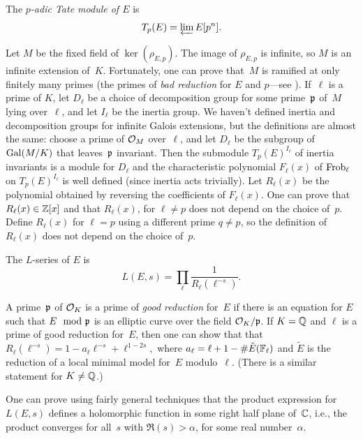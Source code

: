 \begin{definition}
The \emph{$p$-adic Tate module of $E$} is
$$
  T_p(E) = \varprojlim E[p^n].
$$
\end{definition}

Let $M$ be the fixed field of $\ker(\rho_{E,p})$. The image of
$\rho_{E,p}$ is infinite, so $M$ is an infinite extension of~$K$.
Fortunately, one can prove that~$M$ is ramified at only finitely many
primes (the primes of \emph{bad reduction} for $E$ and $p$---see
\cite{serre-tate}).
If~$\ell$ is a prime of $K$, let $D_{\ell}$ be a choice of
decomposition group for
some prime~$\mathfrak{p}$ of~$M$ lying over~$\ell$, and let $I_{\ell}$ be the
inertia group.  We haven't defined inertia and decomposition groups
for infinite Galois extensions, but the definitions are almost the
same: choose a prime of $\mathcal{O}_M$ over~$\ell$, and let $D_{\ell}$ be the
subgroup of $\operatorname{Gal}(M/K)$ that leaves~$\mathfrak{p}$ invariant.  Then the
submodule $T_p(E)^{I_{\ell}}$ of inertia invariants is a module for
$D_{\ell}$ and the characteristic polynomial $F_{\ell}(x)$ of
$\operatorname{Frob}_{\ell}$ on $T_p(E)^{I_{\ell}}$ is well defined (since inertia
acts trivially).  Let $R_{\ell}(x)$ be the polynomial obtained by
reversing the coefficients of $F_{\ell}(x)$.  One can prove that
$R_{\ell}(x) \in \mathbb{Z}[x]$ and that $R_{\ell}(x)$, for $\ell\neq p$ does
not depend on the choice of~$p$.  Define $R_{\ell}(x)$ for $\ell=p$
using a different prime $q\neq p$, so the definition of $R_{\ell}(x)$
does not depend on the choice of~$p$.
\begin{definition}
The $L$-series of $E$ is
$$
 L(E,s) = \prod_{\ell} \frac{1}{R_\ell(\ell^{-s})}.
$$
\end{definition}

A prime~$\mathfrak{p}$ of $\mathcal{O}_K$ is a prime of \emph{good reduction} for~$E$ if
there is an equation for $E$ such that $E \mod {\mathfrak{p}}$ is an elliptic
curve over the field $\mathcal{O}_K/\mathfrak{p}$. If $K=\mathbb{Q}$ and $\ell$ is a prime of
good reduction for~$E$, then one can show that that
$R_{\ell}(\ell^{-s}) = 1 - a_\ell \ell^{-s} + \ell^{1-2s},$
where
$
  a_{\ell} = \ell + 1 - \#\tilde{E}(\mathbb{F}_\ell)
$
and $\tilde{E}$ is the reduction of a local minimal
model for~$E$ modulo~$\ell$.  (There is a similar statement
for $K\neq \mathbb{Q}$.)

One can prove using fairly general techniques that the product
expression for $L(E,s)$ defines a holomorphic function in some right
half plane of~$\mathbb{C}$, i.e., the product converges for all~$s$ with
$\Re(s)>\alpha$, for some real number~$\alpha$.

